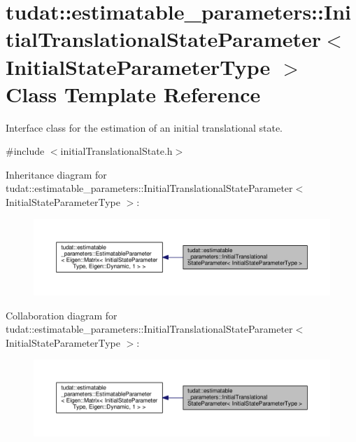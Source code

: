\hypertarget{classtudat_1_1estimatable__parameters_1_1InitialTranslationalStateParameter}{}\section{tudat\+:\+:estimatable\+\_\+parameters\+:\+:Initial\+Translational\+State\+Parameter$<$ Initial\+State\+Parameter\+Type $>$ Class Template Reference}
\label{classtudat_1_1estimatable__parameters_1_1InitialTranslationalStateParameter}


Interface class for the estimation of an initial translational state.  




{\ttfamily \#include $<$initial\+Translational\+State.\+h$>$}



Inheritance diagram for tudat\+:\+:estimatable\+\_\+parameters\+:\+:Initial\+Translational\+State\+Parameter$<$ Initial\+State\+Parameter\+Type $>$\+:
\nopagebreak
\begin{figure}[H]
\begin{center}
\leavevmode
\includegraphics[width=350pt]{classtudat_1_1estimatable__parameters_1_1InitialTranslationalStateParameter__inherit__graph}
\end{center}
\end{figure}


Collaboration diagram for tudat\+:\+:estimatable\+\_\+parameters\+:\+:Initial\+Translational\+State\+Parameter$<$ Initial\+State\+Parameter\+Type $>$\+:
\nopagebreak
\begin{figure}[H]
\begin{center}
\leavevmode
\includegraphics[width=350pt]{classtudat_1_1estimatable__parameters_1_1InitialTranslationalStateParameter__coll__graph}
\end{center}
\end{figure}
